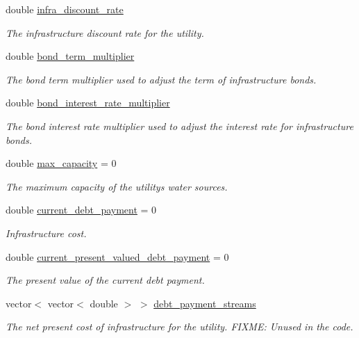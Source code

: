 \begin{DoxyCompactItemize}
double \mbox{\hyperlink{classUtility_a30d506af7125857c7b386f65b10c6d48}{infra\+\_\+discount\+\_\+rate}}
\begin{DoxyCompactList}\small\item\em The infrastructure discount rate for the utility. \end{DoxyCompactList}\item 
double \mbox{\hyperlink{classUtility_a033a19d7bc53d5b879c8b10b159dc6a9}{bond\+\_\+term\+\_\+multiplier}}
\begin{DoxyCompactList}\small\item\em The bond term multiplier used to adjust the term of infrastructure bonds. \end{DoxyCompactList}\item 
double \mbox{\hyperlink{classUtility_aea57a6180aacea15cb9485c455f9c48e}{bond\+\_\+interest\+\_\+rate\+\_\+multiplier}}
\begin{DoxyCompactList}\small\item\em The bond interest rate multiplier used to adjust the interest rate for infrastructure bonds. \end{DoxyCompactList}\item 
double \mbox{\hyperlink{classUtility_aa84826c0ff6f1a9836f52316a4e7e0cd}{max\+\_\+capacity}} = 0
\begin{DoxyCompactList}\small\item\em The maximum capacity of the utility\textquotesingle{}s water sources. \end{DoxyCompactList}\item 
double \mbox{\hyperlink{classUtility_a74b8caabf26e3bbf87871514b0ad7ee1}{current\+\_\+debt\+\_\+payment}} = 0
\begin{DoxyCompactList}\small\item\em Infrastructure cost. \end{DoxyCompactList}\item 
double \mbox{\hyperlink{classUtility_ad94ee8d23bf42c9a2eac017d42100f68}{current\+\_\+present\+\_\+valued\+\_\+debt\+\_\+payment}} = 0
\begin{DoxyCompactList}\small\item\em The present value of the current debt payment. \end{DoxyCompactList}\item 
vector$<$ vector$<$ double $>$ $>$ \mbox{\hyperlink{classUtility_aea06e0ef32e88d9eb34c2407d32bb42f}{debt\+\_\+payment\+\_\+streams}}
\begin{DoxyCompactList}\small\item\em The net present cost of infrastructure for the utility. F\+I\+X\+ME\+: Unused in the code. \end{DoxyCompactList}\item 

\end{DoxyCompactItemize}
